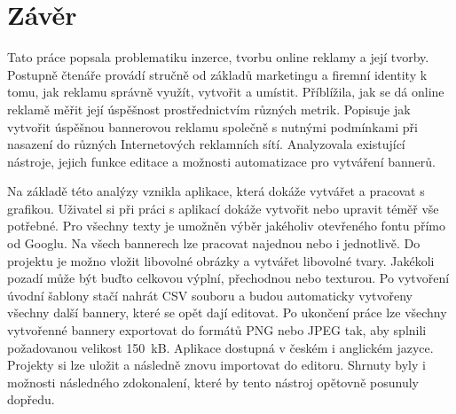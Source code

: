 \chapter{Závěr}
\label{chap:conclusion}
Tato práce popsala problematiku inzerce, tvorbu online reklamy a její tvorby. Postupně čtenáře provádí stručně od základů marketingu a firemní identity k tomu, jak
reklamu správně využít, vytvořit a umístit. Příblížila, jak se dá online reklamě měřit její úspěšnost prostřednictvím různých metrik. Popisuje jak vytvořit úspěšnou bannerovou reklamu
společně s nutnými podmínkami při nasazení do různých Internetových reklamních sítí. 
Analyzovala existující nástroje, jejich funkce editace a možnosti automatizace pro vytváření bannerů.

Na základě této analýzy vznikla aplikace, která dokáže vytvářet a pracovat s grafikou. Uživatel si při práci s aplikací dokáže vytvořit nebo upravit téměř vše potřebné.
Pro všechny texty je umožněn výběr jakéholiv otevřeného fontu přímo od Googlu. Na všech bannerech lze pracovat najednou nebo i jednotlivě. Do projektu je možno vložit
libovolné obrázky a vytvářet libovolné tvary. Jakékoli pozadí může být buďto celkovou výplní, přechodnou nebo texturou. Po vytvoření úvodní šablony stačí nahrát 
CSV souboru a budou automaticky vytvořeny všechny další bannery, které se opět dají editovat. Po ukončení práce lze všechny vytvořenné bannery exportovat do formátů PNG nebo JPEG tak, aby splnili
požadovanou velikost 150~kB. Aplikace dostupná v českém i anglickém jazyce. Projekty si lze uložit a následně znovu importovat do editoru.
Shrnuty byly i možnosti následného zdokonalení, které by tento nástroj opětovně posunuly dopředu. 


\endinput